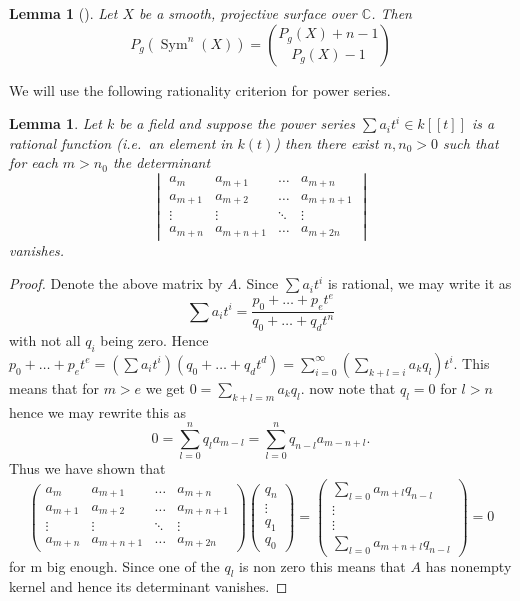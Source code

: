 \documentclass[11pt, a4paper, german]{article}
\theoremstyle{plain}
\newtheorem{lemma}[theorem]{Lemma}
\theoremstyle{definition}
\DeclareMathOperator{\Sym}{Sym}
\begin{document}
\begin{lemma}[{\cite[Lem. 3.8]{MR1996804}}]
    \label{genus}
    Let $X$ be a smooth, projective surface over $\mathbb{C}$. Then
    \[
        P_g(\Sym^n(X)) = \binom{P_g(X) + n - 1}{P_g(X) - 1}
    \]
\end{lemma}

We will use the following rationality criterion for power series.

\begin{lemma}
    Let $k$ be a field and suppose the power series $\sum a_it^i \in k[[t]]$  is a rational function (i.e.\ an element in $k(t)$) then
    there exist $n, n_0 > 0$ such that for each $m > n_0$ the determinant
    \[
        \begin{vmatrix}
            a_m     & a_{m+1} & \dots & a_{m+n} \\
            a_{m+1} & a_{m+2} & \dots & a_{m+n+1} \\
            \vdots  & \vdots  & \ddots & \vdots \\
            a_{m+n} & a_{m+n+1} & \dots & a_{m+2n}
        \end{vmatrix}
    \]
    vanishes.
\end{lemma}
\begin{proof}
    Denote the above matrix by $A$. Since $\sum a_it^i$ is rational, we may write it as
    \[
        \sum a_it^i = \frac{p_0 + \dots + p_et^e}{q_0 + \dots + q_d t^n}
    \]
    with not all $q_i$ being zero.
    Hence 
    $p_0 + \dots + p_et^e = \left(\sum a_it^i\right)\left(q_0 + \dots + q_d t^d\right) = \sum_{i=0}^{\infty} \left(\sum_{k+l=i} a_kq_l\right)t^i$.
    This means that for $m > e$ we get $0 = \sum_{k+l=m} a_kq_l$. now note that $q_l = 0$ for $l > n$ hence we may rewrite this as
    \[
        0 = \sum_{l = 0}^{n} q_la_{m-l} = \sum_{l=0}^n q_{n-l}a_{m-n+l}.
    \]
    Thus we have shown that
    \[
        \begin{pmatrix}
            a_m     & a_{m+1} & \dots & a_{m+n} \\
            a_{m+1} & a_{m+2} & \dots & a_{m+n+1} \\
            \vdots  & \vdots  & \ddots & \vdots \\
            a_{m+n} & a_{m+n+1} & \dots & a_{m+2n}
        \end{pmatrix}
        \begin{pmatrix}
            q_n \\ \vdots \\ q_1 \\ q_0
        \end{pmatrix}
        =
        \begin{pmatrix}
            \sum_{l=0} a_{m+l}q_{n-l} \\ \vdots \\ \vdots \\ \sum_{l=0} a_{m+n+l}q_{n-l}
        \end{pmatrix}
        = 0
    \]
    for m big enough. Since one of the $q_l$ is non zero this means that $A$ has nonempty kernel and hence its determinant vanishes.
\end{proof}
\end{document}
